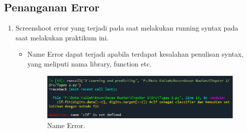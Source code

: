 \subsection{Penanganan Error}
\begin{enumerate}
	\item Screenshoot error yang terjadi pada saat melakukan running syntax pada saat melakukan praktikum ini.
	\begin{itemize}
		\item Name Error dapat terjadi apabila terdapat kesalahan penulisan syntax, yang meliputi nama library, function etc.
		\hfill\break
		\begin{figure}[H]
			\includegraphics[width=10cm, height=3cm\textwidth]{figures/1184077/chapter1/error/error1.PNG}
			\centering
			\caption{Name Error.}
		\end{figure} \\ 


\end{itemize}
\end{enumerate}
